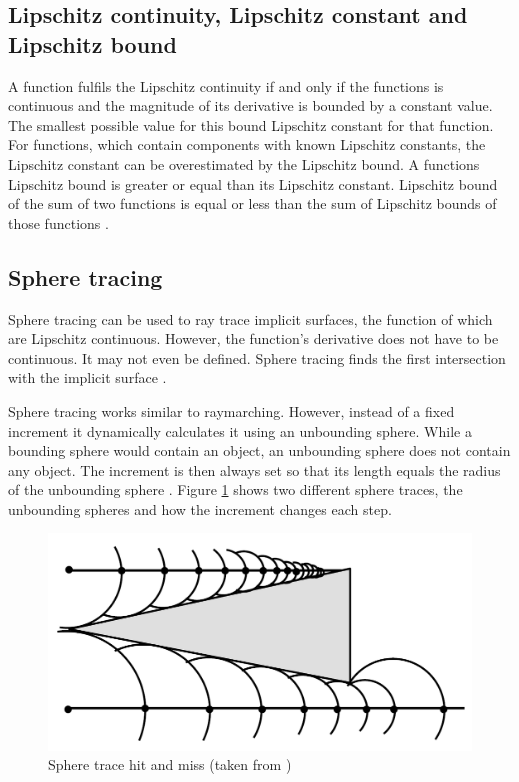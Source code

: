 \subsection{Lipschitz continuity, Lipschitz constant and Lipschitz bound}
A function fulfils the Lipschitz continuity if and only if the functions is continuous and the magnitude of its derivative is bounded by a constant value. The smallest possible value for this bound Lipschitz constant for that function. For functions, which contain components with known Lipschitz constants, the Lipschitz constant can be overestimated by the Lipschitz bound. A functions Lipschitz bound is greater or equal than its Lipschitz constant. Lipschitz bound of the sum of two functions is equal or less than the sum of Lipschitz bounds of those functions 
\cite{hart:1996:sphere} \cite{Heuser:2003}.

\subsection{Sphere tracing}

Sphere tracing can be used to ray trace implicit surfaces, the function of which are Lipschitz continuous. However, the function's derivative does not have to be continuous. It may not even be defined. Sphere tracing finds the first intersection with the implicit surface \cite{hart:1996:sphere}.

Sphere tracing works similar to raymarching. However, instead of a fixed increment it dynamically calculates it using an unbounding sphere. While a bounding sphere would contain an object, an unbounding sphere does not contain any object. The increment is then always set so that its length equals the radius of the unbounding sphere \cite{hart:1996:sphere}. Figure \ref{fig:sphere-trace} shows two different sphere traces, the unbounding spheres and how the increment changes each step.

\begin{figure}
	\includegraphics[width=\linewidth]{sphere-trace-hit-and-miss.png}
	\caption{Sphere trace hit and miss (taken from \cite{hart:1996:sphere})}
	\label{fig:sphere-trace}
\end{figure}

